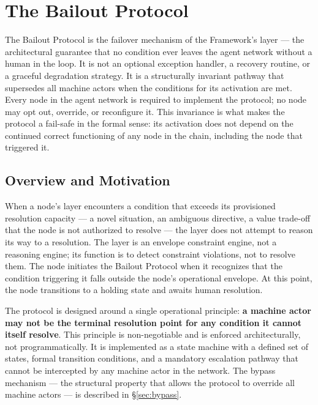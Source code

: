 \section{The Bailout Protocol}
\label{sec:bailout}

The Bailout Protocol is the failover mechanism of the \bxthree{} Framework's \bounds{} layer — the architectural guarantee that no condition ever leaves the agent network without a human in the loop. It is not an optional exception handler, a recovery routine, or a graceful degradation strategy. It is a structurally invariant pathway that supersedes all machine actors when the conditions for its activation are met. Every node in the \bxthree{} agent network is required to implement the protocol; no node may opt out, override, or reconfigure it. This invariance is what makes the protocol a fail-safe in the formal sense: its activation does not depend on the continued correct functioning of any node in the chain, including the node that triggered it.

\subsection{Overview and Motivation}
\label{sec:bailout-overview}

When a node's \bounds{} layer encounters a condition that exceeds its provisioned resolution capacity — a novel situation, an ambiguous directive, a value trade-off that the node is not authorized to resolve — the \bounds{} layer does not attempt to reason its way to a resolution. The \bounds{} layer is an envelope constraint engine, not a reasoning engine; its function is to detect constraint violations, not to resolve them. The node initiates the Bailout Protocol when it recognizes that the condition triggering it falls outside the node's operational envelope. At this point, the node transitions to a holding state and awaits human resolution.

The protocol is designed around a single operational principle: \textbf{a machine actor may not be the terminal resolution point for any condition it cannot itself resolve}. This principle is non-negotiable and is enforced architecturally, not programmatically. It is implemented as a state machine with a defined set of states, formal transition conditions, and a mandatory escalation pathway that cannot be intercepted by any machine actor in the network. The bypass mechanism — the structural property that allows the protocol to override all machine actors — is described in \S\ref{sec:bypass}.

